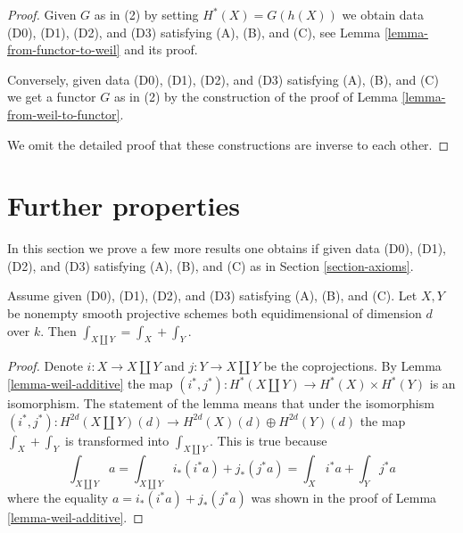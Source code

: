\begin{proof}
Given $G$ as in (2) by setting $H^*(X) = G(h(X))$ we obtain data
(D0), (D1), (D2), and (D3) satisfying (A), (B), and (C),
see Lemma \ref{lemma-from-functor-to-weil} and its proof.

\medskip\noindent
Conversely, given data (D0), (D1), (D2), and (D3)
satisfying (A), (B), and (C) we get a functor $G$ as in (2)
by the construction of the proof of Lemma \ref{lemma-from-weil-to-functor}.

\medskip\noindent
We omit the detailed proof that these constructions are inverse
to each other.
\end{proof}











\section{Further properties}
\label{section-further}

\noindent
In this section we prove a few more results one obtains if
given data (D0), (D1), (D2), and (D3) satisfying (A), (B), and (C) as in
Section \ref{section-axioms}.

\begin{lemma}
\label{lemma-trace-disjoint-union}
Assume given (D0), (D1), (D2), and (D3) satisfying (A), (B), and (C).
Let $X, Y$ be nonempty smooth projective schemes both equidimensional
of dimension $d$ over $k$. Then $\int_{X \amalg Y} = \int_X + \int_Y$.
\end{lemma}

\begin{proof}
Denote $i : X \to X \amalg Y$ and $j : Y \to X \amalg Y$ be the coprojections.
By Lemma \ref{lemma-weil-additive} the map
$(i^*, j^*) : H^*(X \amalg Y) \to H^*(X) \times H^*(Y)$ is an isomorphism.
The statement of the lemma means that under the isomorphism
$(i^*, j^*) : H^{2d}(X \amalg Y)(d) \to H^{2d}(X)(d) \oplus H^{2d}(Y)(d)$
the map $\int_X + \int_Y$ is transformed into $\int_{X \amalg Y}$.
This is true because
$$
\int_{X \amalg Y} a =
\int_{X \amalg Y} i_*(i^*a) + j_*(j^*a) =
\int_X i^*a + \int_Y j^*a
$$
where the equality $a = i_*(i^*a) + j_*(j^*a)$ was shown in
the proof of Lemma \ref{lemma-weil-additive}.
\end{proof}

